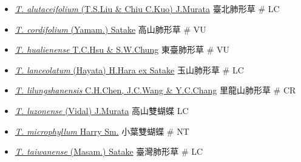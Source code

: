 \begin{itemize}
  \begin{itemize}
        \item[] \href{http://www.theplantlist.org/tpl1.1/search?q=Tripterospermum+alutaceifolium}{\textit{T. alutaceifolium} (T.S.Liu \& Chiu C.Kuo) J.Murata}   臺北肺形草  \# LC
        \item[] \href{http://www.theplantlist.org/tpl1.1/search?q=Tripterospermum+cordifolium}{\textit{T. cordifolium} (Yamam.) Satake}   高山肺形草  \# VU
        \item[] \href{http://www.theplantlist.org/tpl1.1/search?q=Tripterospermum+hualienense}{\textit{T. hualienense} T.C.Hsu \& S.W.Chung}   東臺肺形草  \# VU
        \item[] \href{http://www.theplantlist.org/tpl1.1/search?q=Tripterospermum+lanceolatum}{\textit{T. lanceolatum} (Hayata) H.Hara ex Satake}   玉山肺形草  \# LC
        \item[] \href{http://www.theplantlist.org/tpl1.1/search?q=Tripterospermum+lilungshanensis}{\textit{T. lilungshanensis} C.H.Chen, J.C.Wang \& Y.C.Chang}   里龍山肺形草  \# CR
        \item[] \href{http://www.theplantlist.org/tpl1.1/search?q=Tripterospermum+luzonense}{\textit{T. luzonense} (Vidal) J.Murata}   高山雙蝴蝶   LC
        \item[] \href{http://www.theplantlist.org/tpl1.1/search?q=Tripterospermum+microphyllum}{\textit{T. microphyllum} Harry Sm.}   小葉雙蝴蝶  \# NT
        \item[] \href{http://www.theplantlist.org/tpl1.1/search?q=Tripterospermum+taiwanense}{\textit{T. taiwanense} (Masam.) Satake}   臺灣肺形草  \# LC
  \end{itemize}
  \end{itemize}
